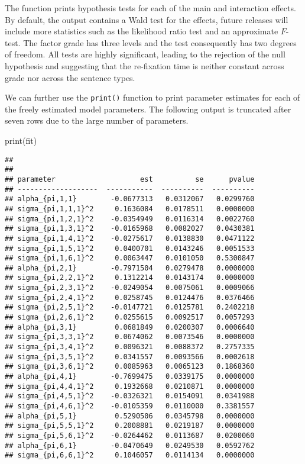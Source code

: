 \documentclass[
]{book}
\newenvironment{Shaded}{\begin{snugshade}}{\end{snugshade}}
\newcommand{\FunctionTok}[1]{\textcolor[rgb]{0.00,0.00,0.00}{#1}}
\newcommand{\NormalTok}[1]{#1}
\begin{document}
The function prints hypothesis tests for each of the main and interaction effects. By default, the output contains a Wald test for the effects, future releases will include more statistics such as the likelihood ratio test and an approximate \(F\)-test. The factor grade has three levels and the test consequently has two degrees of freedom. All tests are highly significant, leading to the rejection of the null hypothesis and suggesting that the re-fixation time is neither constant across grade nor across the sentence types.

We can further use the \texttt{print()} function to print parameter estimates for each of the freely estimated model parameters. The following output is truncated after seven rows due to the large number of parameters.

\begin{Shaded}
\begin{Highlighting}[]
\FunctionTok{print}\NormalTok{(fit)}
\end{Highlighting}
\end{Shaded}

\begin{verbatim}
## 
## 
## parameter                    est          se      pvalue
## -------------------  -----------  ----------  ----------
## alpha_{pi,1,1}        -0.0677313   0.0312067   0.0299760
## sigma_{pi,1,1,1}^2     0.1636084   0.0178511   0.0000000
## sigma_{pi,1,2,1}^2    -0.0354949   0.0116314   0.0022760
## sigma_{pi,1,3,1}^2    -0.0165968   0.0082027   0.0430381
## sigma_{pi,1,4,1}^2    -0.0275617   0.0138830   0.0471122
## sigma_{pi,1,5,1}^2     0.0400701   0.0143246   0.0051533
## sigma_{pi,1,6,1}^2     0.0063447   0.0101050   0.5300847
## alpha_{pi,2,1}        -0.7971504   0.0279478   0.0000000
## sigma_{pi,2,2,1}^2     0.1312214   0.0143174   0.0000000
## sigma_{pi,2,3,1}^2    -0.0249054   0.0075061   0.0009066
## sigma_{pi,2,4,1}^2     0.0258745   0.0124476   0.0376466
## sigma_{pi,2,5,1}^2    -0.0147721   0.0125781   0.2402218
## sigma_{pi,2,6,1}^2     0.0255615   0.0092517   0.0057293
## alpha_{pi,3,1}         0.0681849   0.0200307   0.0006640
## sigma_{pi,3,3,1}^2     0.0674062   0.0073546   0.0000000
## sigma_{pi,3,4,1}^2     0.0096321   0.0088372   0.2757335
## sigma_{pi,3,5,1}^2     0.0341557   0.0093566   0.0002618
## sigma_{pi,3,6,1}^2     0.0085963   0.0065123   0.1868360
## alpha_{pi,4,1}        -0.7699475   0.0339175   0.0000000
## sigma_{pi,4,4,1}^2     0.1932668   0.0210871   0.0000000
## sigma_{pi,4,5,1}^2    -0.0326321   0.0154091   0.0341988
## sigma_{pi,4,6,1}^2    -0.0105359   0.0110000   0.3381557
## alpha_{pi,5,1}         0.5290506   0.0345798   0.0000000
## sigma_{pi,5,5,1}^2     0.2008881   0.0219187   0.0000000
## sigma_{pi,5,6,1}^2    -0.0264462   0.0113687   0.0200060
## alpha_{pi,6,1}        -0.0470649   0.0249530   0.0592762
## sigma_{pi,6,6,1}^2     0.1046057   0.0114134   0.0000000
\end{verbatim}
\end{document}
